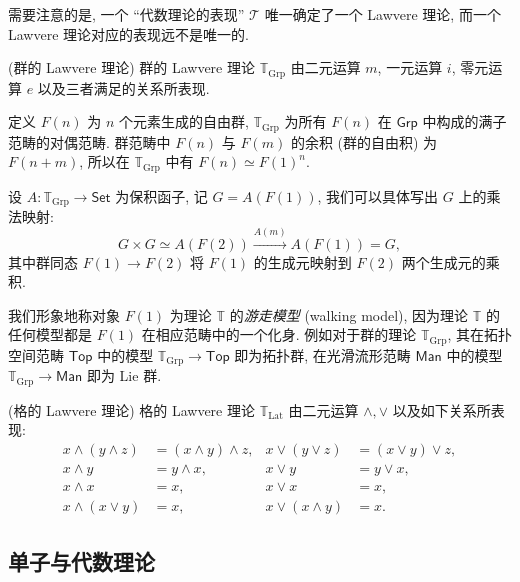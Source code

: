 需要注意的是, 一个 ``代数理论的表现'' $\mathcal T$ 唯一确定了一个 Lawvere 理论, 而一个 Lawvere 理论对应的表现远不是唯一的.

\begin{example}
	{(群的 Lawvere 理论)}
	群的 Lawvere 理论 $\mathbb T_{\text{Grp}}$ 由二元运算 $m$, 一元运算 $i$, 零元运算 $e$ 以及三者满足的关系所表现.
	
	定义 $F(n)$ 为 $n$ 个元素生成的自由群, $\mathbb T_{\text{Grp}}$ 为所有 $F(n)$ 在 $\mathsf {Grp}$ 中构成的满子范畴的对偶范畴. 群范畴中 $F(n)$ 与 $F(m)$ 的余积 (群的自由积) 为 $F(n+m)$, 所以在 $\mathbb T_{\text{Grp}}$ 中有 $F(n) \simeq F(1)^n$.
	
	设 $A \colon \mathbb T_{\text{Grp}} \to \mathsf {Set}$ 为保积函子, 记 $G=A(F(1))$, 我们可以具体写出 $G$ 上的乘法映射:
	$$
	G\times G \simeq A(F(2)) \overset{A(m)}{\longrightarrow} A(F(1)) = G,
	$$
	其中群同态 $F(1) \to F(2)$ 将 $F(1)$ 的生成元映射到 $F(2)$ 两个生成元的乘积.
\end{example}

我们形象地称对象 $F(1)$ 为理论 $\mathbb T$ 的\emph{游走模型} (walking model), 因为理论 $\mathbb T$ 的任何模型都是 $F(1)$ 在相应范畴中的一个化身.
例如对于群的理论 $\mathbb T_{\text{Grp}}$, 其在拓扑空间范畴 $\mathsf {Top}$ 中的模型 $\mathbb T_{\text{Grp}} \to \mathsf {Top}$ 即为拓扑群,
在光滑流形范畴 $\mathsf {Man}$ 中的模型 $\mathbb T_{\text{Grp}} \to \mathsf {Man}$ 即为 Lie 群.

\begin{example}
	{(格的 Lawvere 理论)}
	格的 Lawvere 理论 $\mathbb T_{\text{Lat}}$ 由二元运算 $\land,\lor$ 以及如下关系所表现:
	\begin{align*}
		x\land (y\land z) &= (x\land y)\land z,&
		x\lor (y\lor z) &= (x\lor y)\lor z,\\
		x\land y &= y \land x, & x\lor y &= y \lor x,\\
		x\land x &= x, & x\lor x &= x,\\
		x\land (x\lor y) &= x, & x\lor (x\land y) &= x.
	\end{align*}
\end{example}

\subsection{单子与代数理论}

